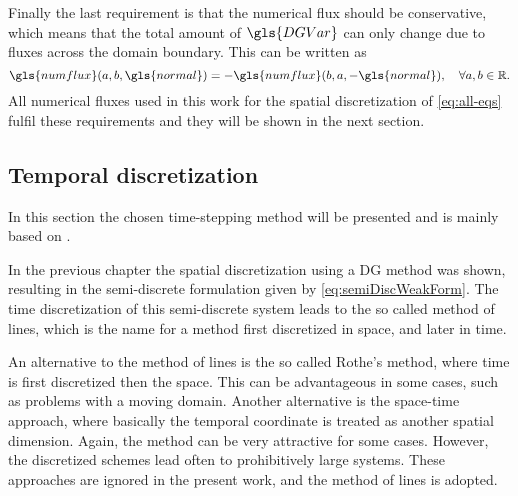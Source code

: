 Finally the last requirement is that the numerical flux should be conservative, which means that the total amount of $\gls{DGVar}$ can only change due to fluxes across the domain boundary. This can be written as
\begin{equation}
	\gls{numflux}(a,b,\gls{normal}) = 	-\gls{numflux}(b,a,-\gls{normal}), \quad \forall a,b \in \mathbb{R}. 
	\label{eq:conservativity}
\end{equation}
All numerical fluxes used in this work for the spatial discretization of \cref{eq:all-eqs} fulfil these requirements and they will be shown in the next section.
\subsection{Temporal discretization}\label{ssec:TemporalDiscretization}
In this section the chosen time-stepping method will be presented and is mainly based on \textcite{levequeFiniteVolumeMethods2002,ferzigerComputationalMethodsFluid2002}.

In the previous chapter the spatial discretization using a DG method was shown, resulting in the semi-discrete formulation given by \cref{eq:semiDiscWeakForm}. The time discretization of this semi-discrete system leads to the so called method of lines, which is the name for a method first discretized in space, and later in time. 

An alternative to the method of lines is the so called Rothe's method, where time is first discretized then the space. This can be advantageous in some cases, such as problems with a moving domain. Another alternative is the space-time approach, where basically the temporal coordinate is treated as another spatial dimension. Again, the method can be very attractive for some cases. However, the discretized schemes lead often to prohibitively large systems. These approaches are ignored in the present work, and the method of lines is adopted.


